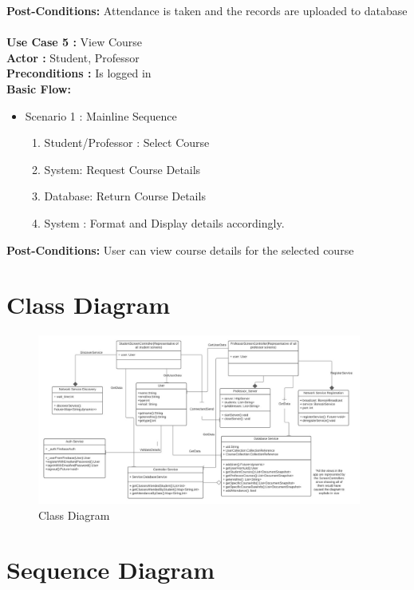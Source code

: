 \documentclass{article}
\begin{document}
\textbf{Post-Conditions: }Attendance is taken and the records are uploaded to database\\ \\
\textbf{Use Case 5 : }View Course\\
\textbf{Actor : }Student, Professor\\
\textbf{Preconditions : }Is logged in\\
\textbf{Basic Flow: } 
\begin{itemize}
    \item Scenario 1 : Mainline Sequence
        \begin{enumerate}
            \item Student/Professor : Select Course
            \item System: Request Course Details
            \item  Database:  Return Course Details
\item System : Format and Display details accordingly.        
\end{enumerate}
\end{itemize}
\textbf{Post-Conditions: }User can view course details for the selected course\\



\section{Class Diagram}
\begin{figure}[H]
    \centering
    \includegraphics[width=0.95\textwidth]{ClassDiagram.jpeg}
    \caption{Class Diagram}
    \label{fig:ClassDiagram}
\end{figure}

\section{Sequence Diagram} 
\end{document}
